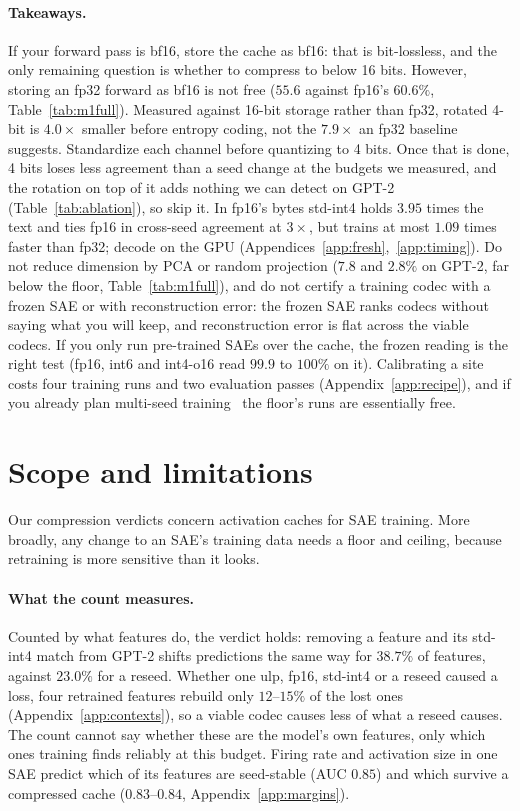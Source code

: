 \documentclass{article}
\begin{document}
\paragraph{Takeaways.} If your forward pass is bf16, store the cache
as bf16: that is bit-lossless, and the only remaining question is
whether to compress to below 16 bits. However, storing an fp32 forward
as bf16 is not free ($55.6$ against fp16's $60.6\%$,
Table~\ref{tab:m1full}). Measured against 16-bit storage rather than
fp32, rotated 4-bit is $4.0\times$ smaller before entropy coding, not
the $7.9\times$ an fp32 baseline suggests. Standardize each channel
before quantizing to 4 bits. Once that is done, 4 bits loses less
agreement than a seed change at the budgets we measured, and the
rotation on top of it adds nothing we can detect on GPT-2
(Table~\ref{tab:ablation}), so skip it.
In fp16's bytes std-int4 holds $3.95$ times the text and ties fp16 in
cross-seed agreement at $3\times$, but trains at most $1.09$ times
faster than fp32; decode on the GPU
(Appendices~\ref{app:fresh},~\ref{app:timing}).
Do not reduce dimension by PCA
or random projection ($7.8$ and $2.8\%$ on GPT-2, far below the floor,
Table~\ref{tab:m1full}), and do not certify a training codec with a
frozen SAE or with reconstruction error: the frozen SAE ranks codecs
without saying what you will keep, and reconstruction error is flat
across the viable codecs.
If you only run pre-trained SAEs over the
cache, the frozen reading is the right test (fp16, int6 and int4-o16
read $99.9$ to $100\%$ on it). Calibrating a site costs four
training runs and two evaluation passes (Appendix~\ref{app:recipe}),
and if you already plan multi-seed training~\citep{paulo} the floor's
runs are essentially free.

\section{Scope and limitations}
\label{sec:transfer}

Our compression verdicts concern activation caches for SAE training.
More broadly, any change to an SAE's training data needs
a floor and ceiling, because retraining is more sensitive than it
looks.

\paragraph{What the count measures.} Counted by what features do, the
verdict holds: removing a feature and its std-int4 match from GPT-2 shifts predictions
the same way for $38.7\%$ of features, against $23.0\%$ for a reseed.
Whether one ulp, fp16, std-int4 or a reseed caused a loss, four retrained features
rebuild only $12$--$15\%$ of the lost ones (Appendix~\ref{app:contexts}),
so a viable codec causes less of what a reseed causes. The count cannot
say whether these are the model's own features, only which ones
training finds reliably at this budget. Firing rate and activation size
in one SAE predict which of its features are seed-stable (AUC $0.85$)
and which survive a compressed cache ($0.83$--$0.84$,
Appendix~\ref{app:margins}).
\end{document}
